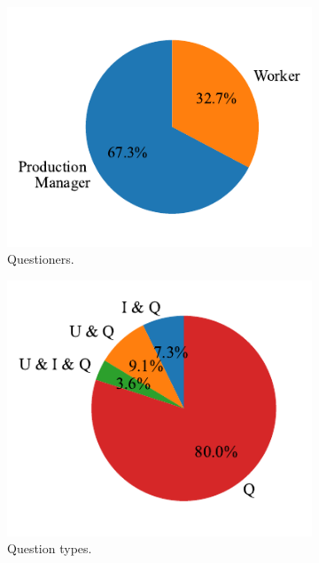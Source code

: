 \documentclass[preprint,12pt]{elsarticle}
\begin{document}
\begin{figure}
\centering
  \begin{subfigure}{0.28\textwidth}
    \includegraphics[width=\linewidth]{figs/questions_sources_user.pdf}
    \caption{Questioners.}
    \label{fig:req_source}
  \end{subfigure}
    \begin{subfigure}{0.32\textwidth}
    \includegraphics[width=\linewidth]{figs/questions_operation_type.pdf}
    \caption{Question types.}
    \label{fig:ques_types}
  \end{subfigure}
  \begin{subfigure}{0.3\textwidth}

\end{subfigure}
\end{figure}
\end{document}
